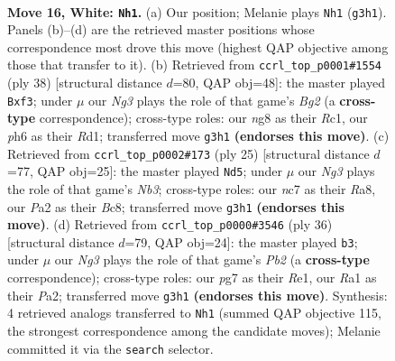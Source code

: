 \documentclass[11pt]{article}
\begin{document}
\clearpage

\begin{figure}[p]\centering
\begin{subfigure}{0.46\textwidth}\centering
\resizebox{\linewidth}{!}{%
\newchessgame
\chessboard[
  setfen={r3kbnr/2n3p1/6bp/p3p3/2B2p1P/4B1NR/PP1K1PP1/R5N1 w kq - 0 16},
  showmover=false,
  pgfstyle=straightmove, color=movearrow, markmove={g3-h1}
]}
\caption{}
\end{subfigure}\hfill
\begin{subfigure}{0.46\textwidth}\centering
\resizebox{\linewidth}{!}{%
\newchessgame
\chessboard[
  setfen={r3k2r/1pb2p1p/1np1p3/p3Pb2/8/2B2pP1/PP1NP1BP/2RR2K1 w kq - 0 20},
  showmover=false,
  pgfstyle=straightmove, color=movearrow, markmove={g2-f3}
]}
\caption{}
\end{subfigure}
\\[4pt]
\begin{subfigure}{0.46\textwidth}\centering
\resizebox{\linewidth}{!}{%
\newchessgame
\chessboard[
  setfen={r1b4r/pp2kppp/1n2p3/PBb5/8/2P2N2/1P2KPPP/R1B4R b - - 0 13},
  showmover=false,
  pgfstyle=straightmove, color=movearrow, markmove={b6-d5}
]}
\caption{}
\end{subfigure}\hfill
\begin{subfigure}{0.46\textwidth}\centering
\resizebox{\linewidth}{!}{%
\newchessgame
\chessboard[
  setfen={r5k1/p1B1ppbp/2b2np1/p7/2P5/6N1/PP1rBPPP/R3R1K1 w - - 2 19},
  showmover=false,
  pgfstyle=straightmove, color=movearrow, markmove={b2-b3}
]}
\caption{}
\end{subfigure}
\caption{\textbf{Move 16, White: \texttt{Nh1}.} (a) Our position; Melanie plays \texttt{Nh1} (\texttt{g3h1}). Panels (b)--(d) are the retrieved master positions whose correspondence most drove this move (highest QAP objective among those that transfer to it). (b) Retrieved from \texttt{ccrl\_top\_p0001\#1554} (ply 38) [structural distance $d$=80, QAP obj=48]: the master played \texttt{Bxf3}; under $\mu$ our \emph{Ng3} plays the role of that game's \emph{Bg2} (a \textbf{cross-type} correspondence); cross-type roles: our \emph{n}g8 as their \emph{R}c1, our \emph{p}h6 as their \emph{R}d1; transferred move \texttt{g3h1} \textbf{(endorses this move)}. (c) Retrieved from \texttt{ccrl\_top\_p0002\#173} (ply 25) [structural distance $d$=77, QAP obj=25]: the master played \texttt{Nd5}; under $\mu$ our \emph{Ng3} plays the role of that game's \emph{Nb3}; cross-type roles: our \emph{n}c7 as their \emph{R}a8, our \emph{P}a2 as their \emph{B}c8; transferred move \texttt{g3h1} \textbf{(endorses this move)}. (d) Retrieved from \texttt{ccrl\_top\_p0000\#3546} (ply 36) [structural distance $d$=79, QAP obj=24]: the master played \texttt{b3}; under $\mu$ our \emph{Ng3} plays the role of that game's \emph{Pb2} (a \textbf{cross-type} correspondence); cross-type roles: our \emph{p}g7 as their \emph{R}e1, our \emph{R}a1 as their \emph{P}a2; transferred move \texttt{g3h1} \textbf{(endorses this move)}. Synthesis: 4 retrieved analogs transferred to \texttt{Nh1} (summed QAP objective 115, the strongest correspondence among the candidate moves); Melanie committed it via the \texttt{search} selector.}
\label{fig:thought-m30}
\end{figure}
\end{document}
